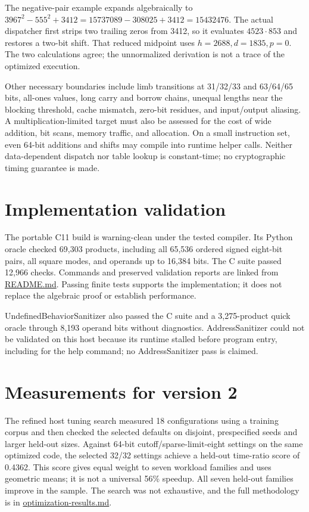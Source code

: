 \documentclass[11pt,a4paper]{article}
\begin{document}
The negative-pair example expands algebraically to $3967^2-555^2+3412=15737089-308025+3412=15432476$. The actual dispatcher first strips two trailing zeros from 3412, so it evaluates $4523\cdot853$ and restores a two-bit shift. That reduced midpoint uses $h=2688,d=1835,p=0$. The two calculations agree; the unnormalized derivation is not a trace of the optimized execution.

Other necessary boundaries include limb transitions at 31/32/33 and 63/64/65 bits, all-ones values, long carry and borrow chains, unequal lengths near the blocking threshold, cache mismatch, zero-bit residues, and input/output aliasing. A multiplication-limited target must also be assessed for the cost of wide addition, bit scans, memory traffic, and allocation. On a small instruction set, even 64-bit additions and shifts may compile into runtime helper calls. Neither data-dependent dispatch nor table lookup is constant-time; no cryptographic timing guarantee is made.

\section{Implementation validation}

The portable C11 build is warning-clean under the tested compiler. Its Python oracle checked 69,303 products, including all 65,536 ordered signed eight-bit pairs, all square modes, and operands up to 16,384 bits. The C suite passed 12,966 checks. Commands and preserved validation reports are linked from \href{\detokenize{README.md}}{README.md}. Passing finite tests supports the implementation; it does not replace the algebraic proof or establish performance.

UndefinedBehaviorSanitizer also passed the C suite and a 3,275-product quick oracle through 8,193 operand bits without diagnostics. AddressSanitizer could not be validated on this host because its runtime stalled before program entry, including for the help command; no AddressSanitizer pass is claimed.

\section{Measurements for version 2}

The refined host tuning search measured 18 configurations using a training corpus and then checked the selected defaults on disjoint, prespecified seeds and larger held-out sizes. Against 64-bit cutoff/sparse-limit-eight settings on the same optimized code, the selected 32/32 settings achieve a held-out time-ratio score of 0.4362. This score gives equal weight to seven workload families and uses geometric means; it is not a universal 56\% speedup. All seven held-out families improve in the sample. The search was not exhaustive, and the full methodology is in \href{\detokenize{optimization-results.md}}{optimization-results.md}.
\end{document}
